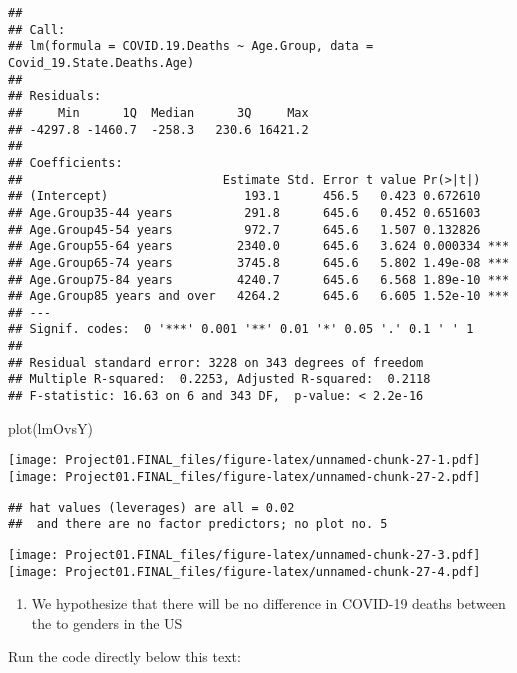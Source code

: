 \documentclass[
]{article}
\newenvironment{Shaded}{\begin{snugshade}}{\end{snugshade}}
\newcommand{\FunctionTok}[1]{\textcolor[rgb]{0.00,0.00,0.00}{#1}}
\newcommand{\NormalTok}[1]{#1}
\providecommand{\tightlist}{%
  \setlength{\itemsep}{0pt}\setlength{\parskip}{0pt}}
\begin{document}
\begin{verbatim}
## 
## Call:
## lm(formula = COVID.19.Deaths ~ Age.Group, data = Covid_19.State.Deaths.Age)
## 
## Residuals:
##     Min      1Q  Median      3Q     Max 
## -4297.8 -1460.7  -258.3   230.6 16421.2 
## 
## Coefficients:
##                            Estimate Std. Error t value Pr(>|t|)    
## (Intercept)                   193.1      456.5   0.423 0.672610    
## Age.Group35-44 years          291.8      645.6   0.452 0.651603    
## Age.Group45-54 years          972.7      645.6   1.507 0.132826    
## Age.Group55-64 years         2340.0      645.6   3.624 0.000334 ***
## Age.Group65-74 years         3745.8      645.6   5.802 1.49e-08 ***
## Age.Group75-84 years         4240.7      645.6   6.568 1.89e-10 ***
## Age.Group85 years and over   4264.2      645.6   6.605 1.52e-10 ***
## ---
## Signif. codes:  0 '***' 0.001 '**' 0.01 '*' 0.05 '.' 0.1 ' ' 1
## 
## Residual standard error: 3228 on 343 degrees of freedom
## Multiple R-squared:  0.2253, Adjusted R-squared:  0.2118 
## F-statistic: 16.63 on 6 and 343 DF,  p-value: < 2.2e-16
\end{verbatim}

\begin{Shaded}
\begin{Highlighting}[]
\FunctionTok{plot}\NormalTok{(lmOvsY)}
\end{Highlighting}
\end{Shaded}

\texttt{[image: Project01.FINAL\_files/figure-latex/unnamed-chunk-27-1.pdf]}
\texttt{[image: Project01.FINAL\_files/figure-latex/unnamed-chunk-27-2.pdf]}

\begin{verbatim}
## hat values (leverages) are all = 0.02
##  and there are no factor predictors; no plot no. 5
\end{verbatim}

\texttt{[image: Project01.FINAL\_files/figure-latex/unnamed-chunk-27-3.pdf]}
\texttt{[image: Project01.FINAL\_files/figure-latex/unnamed-chunk-27-4.pdf]}

\begin{enumerate}
\def\labelenumi{\arabic{enumi}.}
\setcounter{enumi}{2}
\tightlist
\item
  We hypothesize that there will be no difference in COVID-19 deaths
  between the to genders in the US
\end{enumerate}

Run the code directly below this text:
\end{document}
